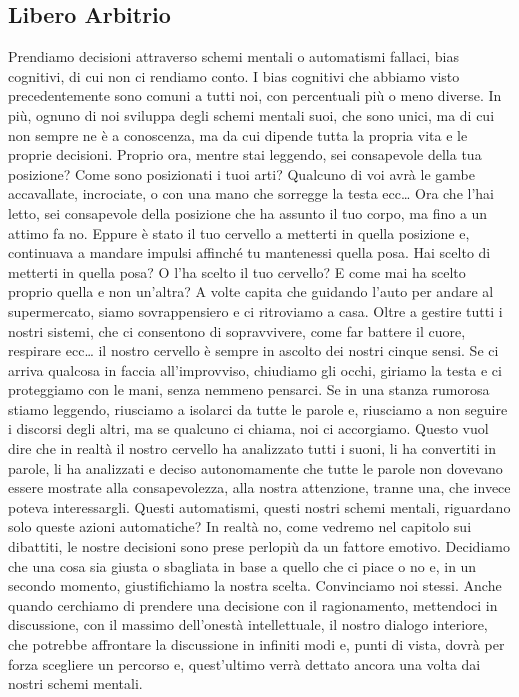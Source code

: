 \documentclass[12pt]{book} %
\begin{document}
\subsection{Libero Arbitrio}
Prendiamo decisioni attraverso schemi mentali o automatismi fallaci, bias cognitivi, di cui non ci rendiamo conto. I
bias cognitivi che abbiamo visto precedentemente sono comuni a tutti noi, con percentuali più o meno diverse. In più,
ognuno di noi sviluppa degli schemi mentali suoi, che sono unici, ma di cui non sempre ne è a conoscenza, ma da cui
dipende tutta la propria vita e le proprie decisioni. Proprio ora, mentre stai leggendo, sei consapevole della tua
posizione? Come sono posizionati i tuoi arti? Qualcuno di voi avrà le gambe accavallate, incrociate, o con una mano che
sorregge la testa ecc… Ora che l'hai letto, sei consapevole della posizione che ha assunto il tuo
corpo, ma fino a un attimo fa no. Eppure è stato il tuo cervello a metterti in quella posizione e, continuava a mandare
impulsi affinché tu mantenessi quella posa. Hai scelto di metterti in quella posa? O l'ha scelto
il tuo cervello? E come mai ha scelto proprio quella e non un'altra? A volte capita che guidando
l'auto per andare al supermercato, siamo sovrappensiero e ci ritroviamo a casa. Oltre a gestire
tutti i nostri sistemi, che ci consentono di sopravvivere, come far battere il cuore, respirare ecc… il nostro cervello
è sempre in ascolto dei nostri cinque sensi. Se ci arriva qualcosa in faccia all'improvviso,
chiudiamo gli occhi, giriamo la testa e ci proteggiamo con le mani, senza nemmeno pensarci. Se in una stanza rumorosa
stiamo leggendo, riusciamo a isolarci da tutte le parole e, riusciamo a non seguire i discorsi degli altri, ma se
qualcuno ci chiama, noi ci accorgiamo. Questo vuol dire che in realtà il nostro cervello ha analizzato tutti i suoni,
li ha convertiti in parole, li ha analizzati e deciso autonomamente che tutte le parole non dovevano essere mostrate
alla consapevolezza, alla nostra attenzione, tranne una, che invece poteva interessargli. Questi automatismi, questi
nostri schemi mentali, riguardano solo queste azioni automatiche? In realtà no, come vedremo nel capitolo sui
dibattiti, le nostre decisioni sono prese perlopiù da un fattore emotivo. Decidiamo che una cosa sia giusta o sbagliata
in base a quello che ci piace o no e, in un secondo momento, giustifichiamo la nostra scelta. Convinciamo noi stessi.
Anche quando cerchiamo di prendere una decisione con il ragionamento, mettendoci in discussione, con il massimo
dell'onestà intellettuale, il nostro dialogo interiore, che potrebbe affrontare la discussione in
infiniti modi e, punti di vista, dovrà per forza scegliere un percorso e, quest'ultimo verrà
dettato ancora una volta dai nostri schemi mentali. 
\end{document}

